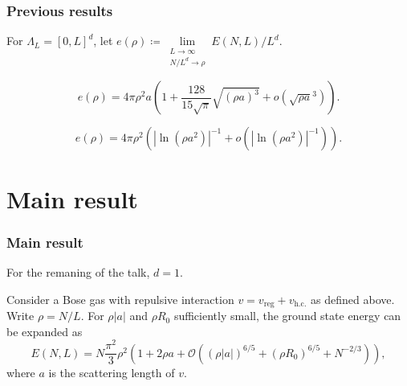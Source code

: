 \documentclass{beamer}[10]
\newcommand{\abs}[1]{\left\lvert #1 \right\rvert}
\begin{document}
\begin{frame}
\frametitle{Previous results}
\begin{block}{}
	For $ \Lambda_L=[0,L]^d $, let $ e(\rho)\coloneqq\lim\limits_{\substack{L\to\infty\\ N/L^{d}\to\rho}}E(N,L)/L^{d} $.
	\begin{Theorem}[$ d=3 $ result, Lee-Huang-Yang]
		\begin{equation}
		e(\rho)=4\pi\rho^2 a\left(1+\frac{128}{15\sqrt{\pi}}\sqrt{(\rho a)^3}+o(\sqrt{\rho a}^3)\right).
		\end{equation}
	\end{Theorem}

	\begin{theorem}[$ d=2 $ result]
		\begin{equation}
		e(\rho)=4\pi \rho^2\left(\abs{\ln(\rho a^2)}^{-1}+o(\abs{\ln(\rho a^2)}^{-1})\right) .
		\end{equation}
	\end{theorem}
\end{block}
\end{frame}


\section{Main result}

\begin{frame}
	\frametitle{Main result}
	\begin{block}{}
		For the remaning of the talk, $ d=1 $.
		\begin{theorem}
			\label{TheoremMain}
			Consider a Bose gas with repulsive interaction  $v=v_{\text{reg}}+v_{\text{h.c.}}$ as defined above. Write $\rho=N/L$. For $\rho|a|$ and $\rho R_0$ sufficiently small, the ground state energy can be expanded as 
			\begin{equation}
			\label{result}
			E(N,L)=N\frac{\pi^2}{3}\rho^2\left(1+2\rho a+
			\mathcal{O}
			\left((\rho|a|)^{6/5}+(\rho R_0)^{6/5}+N^{-2/3}\right)\right),
			\end{equation}
			where $a$ is the scattering length of $v$.
		\end{theorem}
	\end{block}	
\end{frame}
\end{document}
